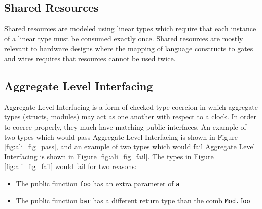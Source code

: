 \documentclass[10pt]{article}
\begin{document}

\subsection{Shared Resources} \label{sec:shared_res}
Shared resources are modeled using linear types which require that each instance of a linear type
must be consumed exactly once. Shared resources are mostly relevant to hardware designs where the
mapping of language constructs to gates and wires requires that resources cannot be used twice.

\subsection{Aggregate Level Interfacing} \label{sec:ali}
Aggregate Level Interfacing is a form of checked type coercion in which aggregate types (structs,
modules) may act as one another with respect to a clock. In order to coerce properly, they much have
matching public interfaces. An example of two types which would pass Aggregate Level Interfacing is
shown in Figure \ref{fig:ali_fig_pass}, and an example of two types which would fail Aggregate Level
Interfacing is shown in Figure \ref{fig:ali_fig_fail}. The types in Figure \ref{fig:ali_fig_fail}
would fail for two reasons:
\begin{itemize}
	\item The public function \verb|foo| has an extra parameter of \verb|a|
	\item The public function \verb|bar| has a different return type than the comb \verb|Mod.foo|
\end{itemize}
\end{document}
